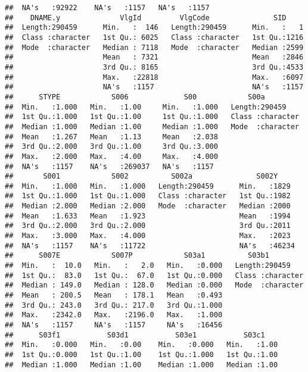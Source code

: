 \documentclass[
]{article}
\begin{document}
\begin{verbatim}
##  NA's   :92922    NA's   :1157   NA's   :1157                     
##    DNAME.y              VlgId         VlgCode               SID      
##  Length:290459      Min.   :  146   Length:290459      Min.   :   1  
##  Class :character   1st Qu.: 6025   Class :character   1st Qu.:1216  
##  Mode  :character   Median : 7118   Mode  :character   Median :2599  
##                     Mean   : 7321                      Mean   :2846  
##                     3rd Qu.: 8165                      3rd Qu.:4533  
##                     Max.   :22818                      Max.   :6097  
##                     NA's   :1157                       NA's   :1157  
##      STYPE            S006             S00            S00a          
##  Min.   :1.000   Min.   :1.00     Min.   :1.000   Length:290459     
##  1st Qu.:1.000   1st Qu.:1.00     1st Qu.:1.000   Class :character  
##  Median :1.000   Median :1.00     Median :1.000   Mode  :character  
##  Mean   :1.267   Mean   :1.13     Mean   :2.038                     
##  3rd Qu.:2.000   3rd Qu.:1.00     3rd Qu.:3.000                     
##  Max.   :2.000   Max.   :4.00     Max.   :4.000                     
##  NA's   :1157    NA's   :269037   NA's   :1157                      
##       S001            S002          S002a               S002Y      
##  Min.   :1.000   Min.   :1.000   Length:290459      Min.   :1829   
##  1st Qu.:1.000   1st Qu.:1.000   Class :character   1st Qu.:1982   
##  Median :2.000   Median :2.000   Mode  :character   Median :2000   
##  Mean   :1.633   Mean   :1.923                      Mean   :1994   
##  3rd Qu.:2.000   3rd Qu.:2.000                      3rd Qu.:2011   
##  Max.   :3.000   Max.   :4.000                      Max.   :2023   
##  NA's   :1157    NA's   :11722                      NA's   :46234  
##      S007E            S007P            S03a1          S03b1          
##  Min.   :  10.0   Min.   :   2.0   Min.   :0.000   Length:290459     
##  1st Qu.:  83.0   1st Qu.:  67.0   1st Qu.:0.000   Class :character  
##  Median : 149.0   Median : 128.0   Median :0.000   Mode  :character  
##  Mean   : 200.5   Mean   : 178.1   Mean   :0.493                     
##  3rd Qu.: 243.0   3rd Qu.: 217.0   3rd Qu.:1.000                     
##  Max.   :2342.0   Max.   :2196.0   Max.   :1.000                     
##  NA's   :1157     NA's   :1157     NA's   :16456                     
##      S03f1           S03d1           S03e1           S03c1      
##  Min.   :0.000   Min.   :0.00    Min.   :0.000   Min.   :1.00   
##  1st Qu.:0.000   1st Qu.:1.00    1st Qu.:1.000   1st Qu.:1.00   
##  Median :1.000   Median :1.00    Median :1.000   Median :1.00   

\end{verbatim}
\end{document}
